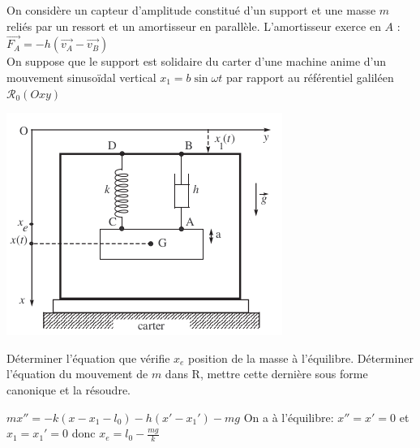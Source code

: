 \begin{Exercise}[title=Sismographe]
	On considère un capteur d'amplitude constitué d'un support et une masse $m$ reliés par un ressort et un amortisseur en parallèle. L'amortisseur exerce en $A$ : $\vec{F_A}=-h(\vec{v_A}-\vec{v_B})$\\
	On suppose que le support est solidaire du carter d'une machine anime d'un mouvement sinusoïdal vertical $x_1= b\sin \omega t$ par rapport au référentiel galiléen $\mathcal{R}_0 (Oxy)$
	\begin{center}
		\includegraphics[scale=0.4]{../fig/sismographe.png}
	\end{center}
	\Question Déterminer l'équation que vérifie $x_e$ position de la masse à l'équilibre.
	\Question Déterminer l'équation du mouvement de $m$ dans R, mettre cette dernière sous forme canonique et la résoudre.
\end{Exercise}
\begin{Answer}
	\Question $m x'' = -k(x-x_1-l_0) - h(x'-x_1')-mg$
	\Question On a à l'équilibre: $x''=x' =0$ et $x_1 = x_1' = 0$ donc
	$x_e=l_0 -\frac{mg}{k} $
\end{Answer}
